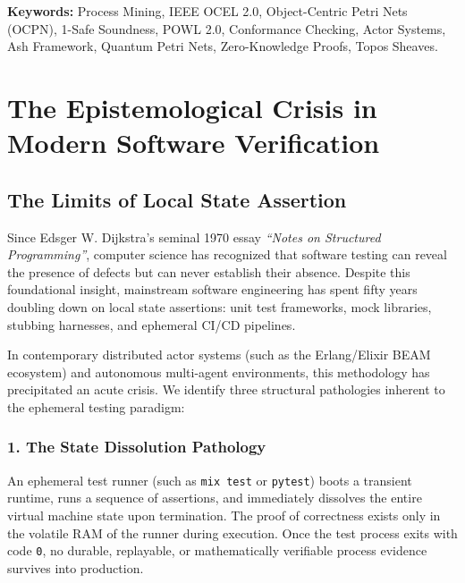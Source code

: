 \documentclass[11pt,a4paper,oneside]{book}
\theoremstyle{definition}
\begin{document}
\vspace{0.8cm}
\noindent\textbf{Keywords:} Process Mining, IEEE OCEL 2.0, Object-Centric Petri Nets (OCPN), 1-Safe Soundness, POWL 2.0, Conformance Checking, Actor Systems, Ash Framework, Quantum Petri Nets, Zero-Knowledge Proofs, Topos Sheaves.

\tableofcontents

\chapter{The Epistemological Crisis in Modern Software Verification}

\section{The Limits of Local State Assertion}
Since Edsger W. Dijkstra's seminal 1970 essay \emph{``Notes on Structured Programming''}, computer science has recognized that software testing can reveal the presence of defects but can never establish their absence. Despite this foundational insight, mainstream software engineering has spent fifty years doubling down on local state assertions: unit test frameworks, mock libraries, stubbing harnesses, and ephemeral CI/CD pipelines.

In contemporary distributed actor systems (such as the Erlang/Elixir BEAM ecosystem) and autonomous multi-agent environments, this methodology has precipitated an acute crisis. We identify three structural pathologies inherent to the ephemeral testing paradigm:

\subsection{1. The State Dissolution Pathology}
An ephemeral test runner (such as \texttt{mix test} or \texttt{pytest}) boots a transient runtime, runs a sequence of assertions, and immediately dissolves the entire virtual machine state upon termination. The proof of correctness exists only in the volatile RAM of the runner during execution. Once the test process exits with code \texttt{0}, no durable, replayable, or mathematically verifiable process evidence survives into production.
\end{document}
